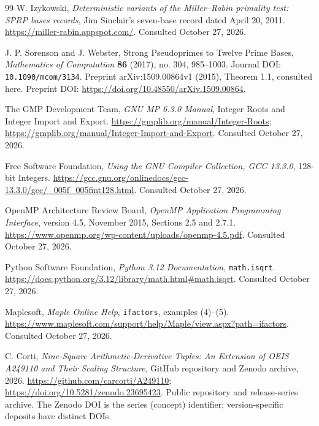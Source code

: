 \documentclass[11pt]{article}
\theoremstyle{definition}
\theoremstyle{remark}
\begin{document}
\begin{thebibliography}{99}
W. Izykowski, \emph{Deterministic variants of the Miller--Rabin
primality test: SPRP bases records}, Jim Sinclair's seven-base
record dated April 20, 2011.
\url{https://miller-rabin.appspot.com/}. Consulted October 27, 2026.

J. P. Sorenson and J. Webster, Strong Pseudoprimes to Twelve Prime
Bases, \emph{Mathematics of Computation} \textbf{86} (2017),
no. 304, 985--1003. Journal DOI: \texttt{10.1090/mcom/3134}.
Preprint arXiv:1509.00864v1 (2015),
Theorem 1.1, consulted here.
Preprint DOI: \url{https://doi.org/10.48550/arXiv.1509.00864}.

The GMP Development Team, \emph{GNU MP 6.3.0 Manual},
Integer Roots and Integer Import and Export.
\url{https://gmplib.org/manual/Integer-Roots};
\url{https://gmplib.org/manual/Integer-Import-and-Export}.
Consulted October 27, 2026.

Free Software Foundation, \emph{Using the GNU Compiler Collection,
GCC 13.3.0}, 128-bit Integers.
\url{https://gcc.gnu.org/onlinedocs/gcc-13.3.0/gcc/_005f_005fint128.html}.
Consulted October 27, 2026.

OpenMP Architecture Review Board, \emph{OpenMP Application
Programming Interface}, version 4.5, November 2015, Sections 2.5
and 2.7.1. \url{https://www.openmp.org/wp-content/uploads/openmp-4.5.pdf}.
Consulted October 27, 2026.

Python Software Foundation, \emph{Python 3.12 Documentation},
\texttt{math.isqrt}.
\url{https://docs.python.org/3.12/library/math.html\#math.isqrt}.
Consulted October 27, 2026.

Maplesoft, \emph{Maple Online Help}, \texttt{ifactors},
examples (4)--(5).
\url{https://www.maplesoft.com/support/help/Maple/view.aspx?path=ifactors}.
Consulted October 27, 2026.

C. Corti, \emph{Nine-Square Arithmetic-Derivative Tuples: An
Extension of OEIS A249110 and Their Scaling Structure},
GitHub repository and Zenodo archive, 2026.
\url{https://github.com/carcorti/A249110};
\url{https://doi.org/10.5281/zenodo.23695423}.
Public repository and release-series archive. The Zenodo DOI is the
series (concept) identifier; version-specific deposits have distinct DOIs.

\end{thebibliography}
\end{document}
